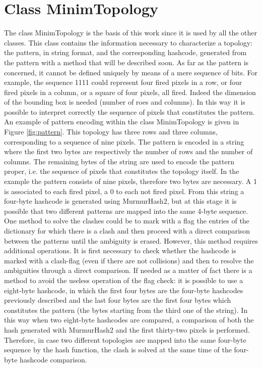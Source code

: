 \section{Class MinimTopology}
The class MinimTopology is the basis of this work since it is used by all the other classes. This class contains the information necessary to characterize a topology: the pattern, in string format, and the corresponding hashcode, generated from the pattern with a method that will be described soon. As far as the pattern is concerned, it cannot be defined uniquely by means of a mere sequence of bits. For example, the sequence 1111 could represent four fired pixels in a row, or four fired pixels in a column, or a square of four pixels, all fired. Indeed the dimension of the bounding box is needed (number of roes and columns). In this way it is possible to interpret correctly the sequence of pixels that constitutes the pattern. An example of pattern encoding within the class MinimTopology is given in Figure \ref{fig:pattern}. This topology has three rows and three columns, corresponding to a sequence of nine pixels. The pattern is encoded in a string where the first two bytes are respectively the number of rows and the number of columns. The remaining bytes of the string are used to encode the pattern proper, i.e. the sequence of pixels that constitutes the topology itself. In the example the pattern consists of nine pixels, therefore two bytes are necessary. A 1 is associated to each fired pixel, a 0 to each not fired pixel. From this string a four-byte hashcode is generated using MurmurHash2, but at this stage it is possible that two different patterns are mapped into the same 4-byte sequence. One method to solve the clashes could be to mark with a flag the entries of the dictionary for which there is a clash and then proceed with a direct comparison between the patterns until the ambiguity is erased. However, this method requires additional operations. It is first necessary to check whether the hashcode is marked with a clash-flag (even if there are not collisions) and then to resolve the ambiguities through a direct comparison. If needed as a matter of fact there is a method to avoid the useless operation of the flag check: it is possible to use a eight-byte hashcode, in which the first four bytes are the four-byte hashcodes previously described and the last four bytes are the first four bytes which constitutes the pattern (the bytes starting from the third one of the string). In this way when two eight-byte hashcodes are compared, a comparison of both the hash generated with MurmurHash2 and the first thirty-two pixels is performed. Therefore, in case two different topologies are mapped into the same four-byte sequence by the hash function, the clash is solved at the same time of the four-byte hashcode comparison.
